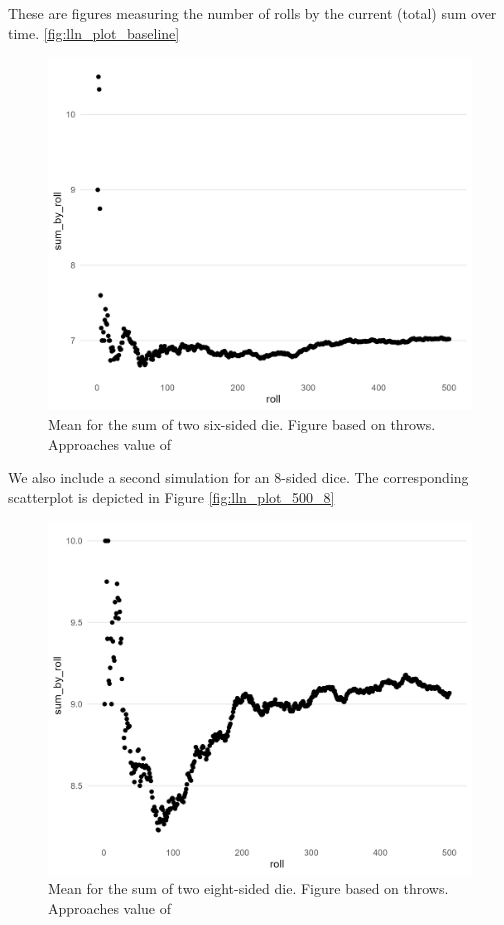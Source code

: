 \documentclass[12pt]{article}
\theoremstyle{definition}
\begin{document}
These are figures measuring the number of rolls by the current (total) sum over time. 
\ref{fig:lln_plot_baseline}
\begin{figure}[tbh!]
\centering
\includegraphics[width=.8\linewidth]{plot/baseline/lln_plot_baseline.png}
\caption[]{Mean for the sum of two six-sided die. Figure based on throws. Approaches value of }
\label{fig:scatter_baseline}
\end{figure}

We also include a second simulation for an 8-sided dice. The corresponding scatterplot is depicted in Figure \ref{fig:lln_plot_500_8} 
\begin{figure}[tbh!]
\centering
\includegraphics[width=.8\linewidth]{plot/500_8/lln_plot_500_8.png}
\caption[]{Mean for the sum of two eight-sided die. Figure based on throws. Approaches value of }
\label{fig:scatter_8side}
\end{figure}
\end{document}
